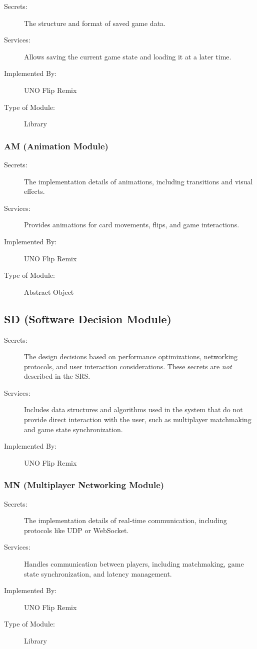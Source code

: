 \documentclass[12pt, titlepage]{article}
\begin{document}
\begin{description}
\item[Secrets:] The structure and format of saved game data.
\item[Services:] Allows saving the current game state and loading it at a later time.
\item[Implemented By:] UNO Flip Remix
\item[Type of Module:] Library
\end{description}

\subsubsection{AM (Animation Module)} \label{mAM}

\begin{description}
\item[Secrets:] The implementation details of animations, including transitions and visual effects.
\item[Services:] Provides animations for card movements, flips, and game interactions.
\item[Implemented By:] UNO Flip Remix
\item[Type of Module:] Abstract Object
\end{description}

\subsection{SD (Software Decision Module)} \label{mSD}

\begin{description}
\item[Secrets:] The design decisions based on performance optimizations, networking protocols, and user interaction considerations. These secrets are \emph{not} described in the SRS.
\item[Services:] Includes data structures and algorithms used in the system that do not provide direct interaction with the user, such as multiplayer matchmaking and game state synchronization.
\item[Implemented By:] UNO Flip Remix
\end{description}

\subsubsection{MN (Multiplayer Networking Module)} \label{mMN}

\begin{description}
\item[Secrets:] The implementation details of real-time communication, including protocols like UDP or WebSocket.
\item[Services:] Handles communication between players, including matchmaking, game state synchronization, and latency management.
\item[Implemented By:] UNO Flip Remix
\item[Type of Module:] Library
\end{description}
\end{document}
